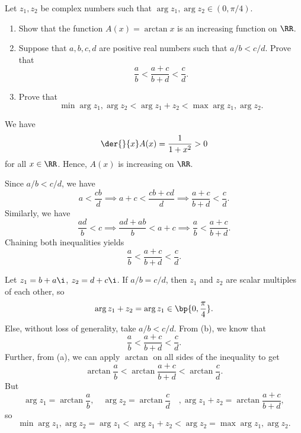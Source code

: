 \begin{problem}
    Let $z_1, z_2$ be complex numbers such that $\arg{z_1}, \arg{z_2} \in (0, \pi/4)$.

    \begin{enumerate}
        \item Show that the function $A(x) = \arctan x$ is an increasing function on $\RR$.
        \item Suppose that $a, b, c, d$ are positive real numbers such that $a/b < c/d$. Prove that \[\frac{a}{b} < \frac{a + c}{b + d} < \frac{c}{d}.\]
        \item Prove that \[\min{\arg{z_1}, \arg{z_2}} < \arg{z_1 + z_2} < \max{\arg{z_1}, \arg{z_2}}.\]
    \end{enumerate}
\end{problem}
\begin{solution}
    \begin{ppart}
        We have \[\der{}{x} A(x) = \frac{1}{1 + x^2} > 0\] for all $x \in \RR$. Hence, $A(x)$ is increasing on $\RR$.
    \end{ppart}
    \begin{ppart}
        Since $a/b < c/d$, we have \[a < \frac{cb}{d} \implies a + c < \frac{cb + cd}{d} \implies \frac{a + c}{b + d} < \frac{c}{d}.\] Similarly, we have \[\frac{ad}{b} < c \implies \frac{ad + ab}{b} < a + c \implies \frac{a}{b} < \frac{a + c}{b + d}.\] Chaining both inequalities yields \[\frac{a}{b} < \frac{a + c}{b + d} < \frac{c}{d}.\]
    \end{ppart}
    \begin{ppart}
        Let $z_1 = b + a\i$, $z_2 = d + c\i$. If $a/b = c/d$, then $z_1$ and $z_2$ are scalar multiples of each other, so \[\arg{z_1 + z_2} = \arg{z_1} \in \bp{0, \frac\pi4}.\] Else, without loss of generality, take $a/b < c/d$. From (b), we know that \[\frac{a}{b} < \frac{a + c}{b + d} < \frac{c}{d}.\] Further, from (a), we can apply $\arctan$ on all sides of the inequality to get \[\arctan \frac{a}{b} < \arctan \frac{a + c}{b + d} < \arctan \frac{c}{d}.\] But \[\arg{z_1} = \arctan \frac{a}{b}, \quad \arg{z_2} = \arctan \frac{c}{d} \quad, \arg{z_1 + z_2} = \arctan \frac{a + c}{b + d},\] so \[\min{\arg{z_1}, \arg{z_2}} = \arg{z_1} < \arg{z_1 + z_2} < \arg{z_2} = \max{\arg{z_1}, \arg{z_2}}.\]
    \end{ppart}
\end{solution}

